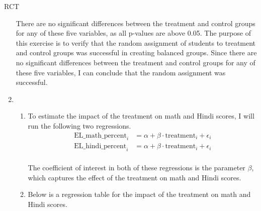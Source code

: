 \begin{homeworkProblem}{RCT}
\begin{solution}
\begin{enumerate}
                \pagebreak

                There are no significant differences between the treatment and
                control groups for any of these five variables, as all p-values
                are above 0.05. The purpose of this exercise is to verify that
                the random assignment of students to treatment and control groups
                was successful in creating balanced groups. Since there are no
                significant differences between the treatment and control groups
                for any of these five variables, I can conclude that the random
                assignment was successful.

            \item \begin{enumerate}
                \item To estimate the impact of the treatment on math and
                    Hindi scores, I will run the following two regressions.
                    \[
                        \begin{split}
                            \text{EL\_math\_percent}_i &= \alpha + \beta \cdot \text{treatment}_i + \epsilon_i \\
                            \text{EL\_hindi\_percent}_i &= \alpha + \beta \cdot \text{treatment}_i + \epsilon_i \\
                        \end{split}
                    \]

                    The coefficient of interest in both of these regressions 
                    is the parameter $\beta$, which captures the effect of the 
                    treatment on math and Hindi scores.
                \item Below is a regression table for the impact of the
                    treatment on math and Hindi scores.
                    

\end{enumerate}
\end{enumerate}
\end{solution}
\end{homeworkProblem}
